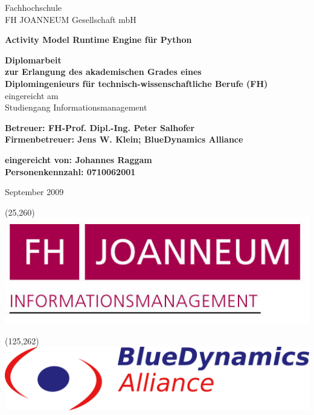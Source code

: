 \begin{center}
Fachhochschule\\
FH JOANNEUM Gesellschaft mbH

\addvspace{5mm}


\textbf{Activity Model Runtime Engine für Python}

\addvspace{5mm}

\textbf{
Diplomarbeit\\
zur Erlangung des akademischen Grades eines\\
Diplomingenieurs für technisch-wissenschaftliche Berufe (FH)
}
eingereicht am\\
Studiengang Informationsmanagement\\

\addvspace{5mm}


\textbf{
Betreuer: FH-Prof. Dipl.-Ing. Peter Salhofer\\
Firmenbetreuer: Jens W. Klein; BlueDynamics Alliance
}

\addvspace{5mm}

\textbf{
eingereicht von: Johannes Raggam\\
Personenkennzahl: 0710062001
}

\addvspace{5mm}

September 2009
\end{center}


\begin{textblock}{}(25,260)
  \includegraphics[scale=1]{resources/logo_ima}
\end{textblock}

\begin{textblock}{}(125,262)
  \includegraphics[scale=0.85]{resources/logo_bda}
\end{textblock}


